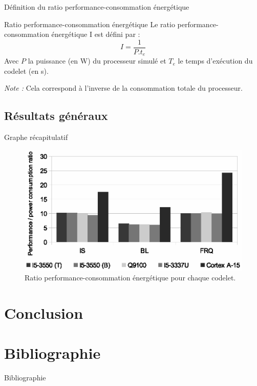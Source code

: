 \documentclass{beamer}
\begin{document}
\begin{frame}{Définition du ratio performance-consommation énergétique}
\begin{block}{Ratio performance-consommation énergétique}
Le ratio performance-consommation énergétique I est défini par :
\begin{equation*}
I=\frac{1}{P.t_e}
\end{equation*}
Avec $P$ la puissance (en W) du processeur simulé et $T_e$ le temps d'exécution du codelet (en s).
\end{block}
\textit{Note :} Cela correspond à l'inverse de la consommation totale du processeur.
\end{frame}

\subsection{Résultats généraux}

\begin{frame}{Graphe récapitulatif}
\begin{figure}
\centering
\includegraphics[width=0.65\paperwidth]{Ratio.eps}
\caption{\label{Ratio}Ratio performance-consommation énergétique pour chaque codelet.}
\end{figure}

\end{frame}

\section{Conclusion}
\begin{frame}
\end{frame}

\section{Bibliographie}
\begin{frame}{Bibliographie}


\end{frame}
\end{document}
